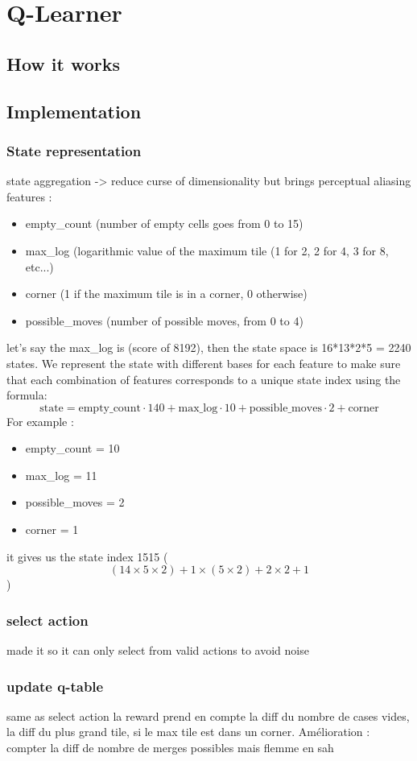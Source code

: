\chapter{Q-Learner}

\section{How it works}


\section{Implementation}
\subsection{State representation}
state aggregation -> reduce curse of dimensionality but brings perceptual aliasing
features :
\begin{itemize}
    \item empty\_count (number of empty cells goes from 0 to 15)
    \item max\_log (logarithmic value of the maximum tile (1 for 2, 2 for 4, 3 for 8, etc...)
    \item corner (1 if the maximum tile is in a corner, 0 otherwise)
    \item possible\_moves (number of possible moves, from 0 to 4)
\end{itemize}
let's say the max\_log is  (score of 8192), then the state space is 16*13*2*5 = 2240 states.
We represent the state with different bases for each feature to make sure that each combination of features corresponds to a unique state index using the formula:
\[
\text{state} = \text{empty\_count} \cdot 140 + \text{max\_log} \cdot 10 + \text{possible\_moves} \cdot 2 + \text{corner}
\]
For example :
\begin{itemize}
    \item empty\_count = 10
    \item max\_log = 11
    \item possible\_moves = 2
    \item corner = 1
\end{itemize}
it gives us the state index 1515 (\[(14 \times 5 \times 2) + 1 \times (5 \times 2) + 2 \times 2 + 1
\])




\subsection{select action}
made it so it can only select from valid actions to avoid noise
\subsection{update q-table}
same as select action
la reward prend en compte la diff du nombre de cases vides, la diff du plus grand tile, si le max tile est dans un corner. Amélioration : compter la diff de nombre de merges possibles mais flemme en sah